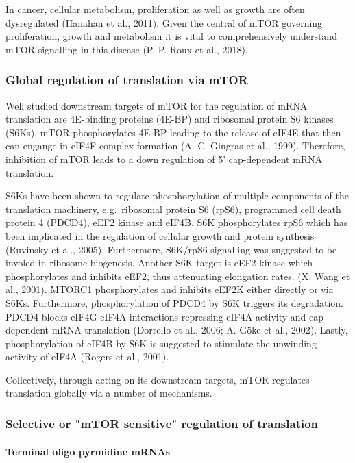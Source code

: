 \documentclass[12pt,openany]{book}
\begin{document}
In cancer, cellular metabolism, proliferation as well as growth are
often dysregulated (Hanahan et al., 2011). Given the central of mTOR
governing proliferation, growth and metabolism it is vital to
comprehensively understand mTOR signalling in this disease (P. P. Roux
et al., 2018).

\subsubsection{Global regulation of translation via mTOR}

Well studied downstream targets of mTOR for the regulation of mRNA
translation are 4E-binding proteins (4E-BP) and ribosomal protein S6
kinases (S6Ks). mTOR phosphorylates 4E-BP leading to the release of
eIF4E that then can engange in eIF4F complex formation (A.-C. Gingras et
al., 1999). Therefore, inhibition of mTOR leads to a down regulation of
5' cap-dependent mRNA translation.

S6Ks have been shown to regulate phosphorylation of multiple components
of the translation machinery, e.g.~ribosomal protein S6 (rpS6),
programmed cell death protein 4 (PDCD4), eEF2 kinase and eIF4B. S6K
phosphorylates rpS6 which has been implicated in the regulation of
cellular growth and protein synthesis (Ruvinsky et al., 2005).
Furthermore, S6K/rpS6 signalling was suggested to be involed in ribosome
biogenesis. Another S6K target is eEF2 kinase which phosphorylates and
inhibits eEF2, thus attenuating elongation rates. (X. Wang et al.,
2001). MTORC1 phosphorylates and inhibits eEF2K either directly or via
S6Ks. Furthermore, phosphorylation of PDCD4 by S6K triggers its
degradation. PDCD4 blocks eIF4G-eIF4A interactions repressing eIF4A
activity and cap-dependent mRNA translation (Dorrello et al., 2006; A.
Göke et al., 2002). Lastly, phosphorylation of eIF4B by S6K is suggested
to stimulate the unwinding activity of eIF4A (Rogers et al., 2001).

Collectively, through acting on its downstream targets, mTOR regulates
translation globally via a number of mechanisms.

\subsubsection{Selective or "mTOR sensitive" regulation of translation}

\paragraph{Terminal oligo pyrmidine mRNAs}
\end{document}
